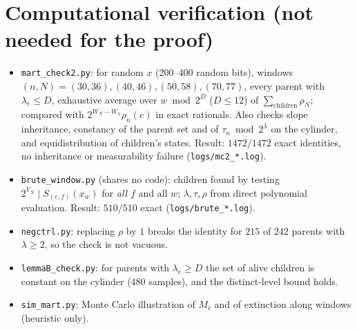 \documentclass[11pt]{amsart}
\theoremstyle{definition}
\begin{document}
\section{Computational verification (not needed for the proof)}
\begin{itemize}
\item \texttt{mart\_check2.py}: for random $x$ (200--400 random bits), windows $(n,N)=(30,36),(40,46),(50,58),(70,77)$, every parent with
$\lambda_e\le D$, exhaustive average over $w\bmod2^D$ ($D\le12$) of $\sum_{\text{children}}\rho_N$; compared with $2^{W_N-W_n}\rho_n(e)$ in exact rationals.
Also checks slope inheritance, constancy of the parent set and of $\tau_n\bmod 2^\lambda$ on the cylinder, and equidistribution of children's states.
Result: $1472/1472$ exact identities, no inheritance or measurability failure (\texttt{logs/mc2\_*.log}).
\item \texttt{brute\_window.py} (shares no code): children found by testing $2^{V_N}\mid S_{(e,f)}(x_w)$ for \emph{all} $f$ and all $w$;
$\lambda,\tau,\rho$ from direct polynomial evaluation. Result: $510/510$ exact (\texttt{logs/brute\_*.log}).
\item \texttt{negctrl.py}: replacing $\rho$ by $1$ breaks the identity for $215$ of $242$ parents with $\lambda\ge2$, so the check is not vacuous.
\item \texttt{lemmaB\_check.py}: for parents with $\lambda_e\ge D$ the set of alive children is constant on the cylinder ($480$ samples), and the
distinct-level bound holds.
\item \texttt{sim\_mart.py}: Monte Carlo illustration of $M_\ell$ and of extinction along windows (heuristic only).
\end{itemize}
\end{document}
